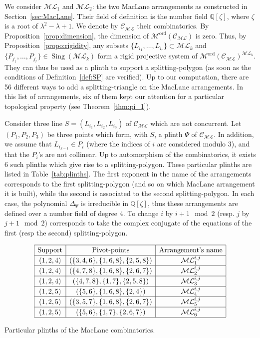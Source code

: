 \documentclass[11pt, a4paper]{amsart}
\theoremstyle{definition}
\theoremstyle{remark}
\newcommand{\QQ}{\mathds{Q}}
\newcommand{\C}{\mathcal{C}}
\newcommand{\M}{\mathcal{M}}
\newcommand{\ML}{\mathcal{ML}}
\newcommand{\ord}{\text{ord}}
\DeclareMathOperator{\sing}{Sing}
\begin{document}
We consider $\ML_1$ and $\ML_2$: the two MacLane arrangements as constructed in Section~\ref{sec:MacLane}. Their field of definition is the number field $\QQ[\zeta]$, where $\zeta$ is a root of $\lambda^2 - \lambda +1$. We denote by $\C_\ML$ their combinatorics. By Proposition~\ref{prop:dimension}, the dimension of $\M^\ord(\C_\ML)$ is zero. Thus, by Proposition~\ref{propo:rigidity},  any subsets $\{L_{i_1},\dots,L_{i_r}\} \subset \ML_k$ and $\{P_{j_1},\dots,P_{j_r}\}\in\sing(\ML_k)$ form a rigid projective system of $\M^\ord(\C_\ML)^{\ML_k}$. They can thus be used as a plinth to support a splitting-polygon (as soon as the conditions of Definition~\ref{def:SP} are verified). Up to our computation, there are 56 different ways to add a splitting-triangle on the MacLane arrangements. In this list of arrangements, six of them kept our attention for a particular topological property (see Theorem~\ref{thm:pi_1}). 

Consider three line $S=(L_{i_1},L_{i_2},L_{i_3})$ of $\C_\ML$ which are not concurrent. Let $(P_1,P_2,P_3)$ be three points which form, with $S$, a plinth $\Psi$ of $\C_\ML$. In addition, we assume that $L_{i_{k-1}}\in P_i$ (where the indices of $i$ are considered modulo $3$), and that the $P_i$'s are not collinear.  Up to automorphism of the combinatorics, it exists $6$ such plinths which give rise to a splitting-polygon. These particular plinths are listed in Table~\ref{tab:plinths}. The first exponent in the name of the arrangements corresponds to the first splitting-polygon (and so on which MacLane arrangement it is built), while the second is associated to the second splitting-polygon. In each case, the polynomial $\Delta_{\Psi}$ is irreducible in $\QQ[\zeta]$, thus these arrangements are defined over a number field of degree 4. To change $i$ by $i+1 \mod 2$ (resp. $j$ by $j+1 \mod 2$) corresponds to take the complex conjugate of the equations of the first (resp the second) splitting-polygon.

\begin{table}[h!]
	\begin{equation*}
		\def\arraystretch{1.2}
		\begin{array}{|c|c|c|}
			\hline
			\text{Support} & \text{Pivot-points} & \text{Arrangement's name} \\ \hline
			(1, 2, 4) & (\{3, 4, 6\}, \{1, 6, 8\}, \{2, 5, 8\}) & \ML_1^{i,j} \\ \hline
			(1, 2, 4) & (\{4, 7, 8\}, \{1, 6, 8\}, \{2, 6, 7\}) & \ML_2^{i,j} \\ \hline
			(1, 2, 4) & (\{4, 7, 8\}, \{1, 7\}, \{2, 5, 8\}) & \ML_3^{i,j} \\ \hline
			(1, 2, 5) & (\{5, 6\}, \{1, 6, 8\}, \{2, 4\}) & \ML_4^{i,j} \\ \hline
			(1, 2, 5) & (\{3, 5, 7\}, \{1, 6, 8\}, \{2, 6, 7\}) & \ML_5^{i,j} \\ \hline
			(1, 2, 5) & (\{5, 6\}, \{1, 7\}, \{2, 6, 7\}) & \ML_6^{i,j} \\ \hline
		\end{array}
	\end{equation*}
	\caption{Particular plinths of the MacLane combinatorics.\label{tab:plinths}}
\end{table}
\end{document}
